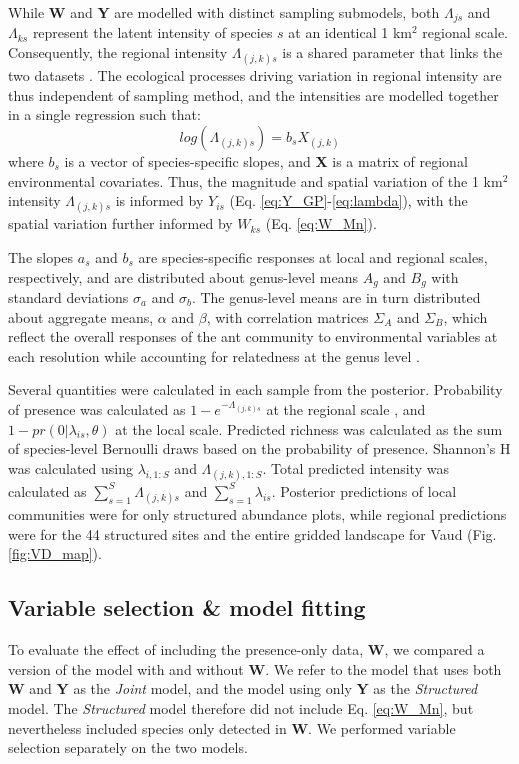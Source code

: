 \documentclass[preprint,final,times,12pt,3p]{elsarticle}
\begin{document}
While \textbf{W} and \textbf{Y} are modelled with distinct sampling submodels, both $\Lambda_{js}$ and $\Lambda_{ks}$ represent the latent intensity of species $s$ at an identical 1 km$^2$ regional scale. Consequently, the regional intensity $\Lambda_{(j,k)s}$ is a shared parameter that links the two datasets \citep{Hefley2016,Isaac2019,Miller2019}. The ecological processes driving variation in regional intensity are thus independent of sampling method, and the intensities are modelled together in a single regression such that:
    \begin{equation}
        log(\Lambda_{(j,k)s}) = b_s X_{(j,k)} 
        \label{eq:LAMBDA}
    \end{equation}
where $b_s$ is a vector of species-specific slopes, and \textbf{X} is a matrix of regional environmental covariates. Thus, the magnitude and spatial variation of the 1 km$^2$ intensity $\Lambda_{(j,k)s}$ is informed by $Y_{is}$ (Eq. \ref{eq:Y_GP}-\ref{eq:lambda}), with the spatial variation further informed by $W_{ks}$ (Eq. \ref{eq:W_Mn}).

The slopes $a_s$ and $b_s$ are species-specific responses at local and regional scales, respectively, and are distributed about genus-level means $A_g$ and $B_g$ with standard deviations $\sigma_a$ and $\sigma_b$. The genus-level means are in turn distributed about aggregate means, $\alpha$ and $\beta$, with correlation matrices $\Sigma_A$ and $\Sigma_B$, which reflect the overall responses of the ant community to environmental variables at each resolution while accounting for relatedness at the genus level \citep{Hadfield2010b,Ovaskainen2011,Szewczyk2018,Caradima2019}.

Several quantities were calculated in each sample from the posterior. Probability of presence was calculated as $1 - e^{-\Lambda_{(j,k)s}}$ at the regional scale \citep{Hefley2016}, and $1 - pr(0 | \lambda_{is}, \theta)$ at the local scale. Predicted richness was calculated as the sum of species-level Bernoulli draws based on the probability of presence. Shannon's H was calculated using $\lambda_{i,1:S}$ and $\Lambda_{(j,k),1:S}$. Total predicted intensity was calculated as $\sum_{s=1}^{S}\Lambda_{(j,k)s}$ and $\sum_{s=1}^{S}\lambda_{is}$. Posterior predictions of local communities were for only structured abundance plots, while regional predictions were for the 44 structured sites and the entire gridded landscape for Vaud (Fig. \ref{fig:VD_map}). 



\subsection{Variable selection \& model fitting}
To evaluate the effect of including the presence-only data, \textbf{W}, we compared a version of the model with and without \textbf{W}. We refer to the model that uses both \textbf{W} and \textbf{Y} as the \emph{Joint} model, and the model using only \textbf{Y} as the \emph{Structured} model. The \emph{Structured} model therefore did not include Eq. \ref{eq:W_Mn}, but nevertheless included species only detected in \textbf{W}. We performed variable selection separately on the two models.
\end{document}

